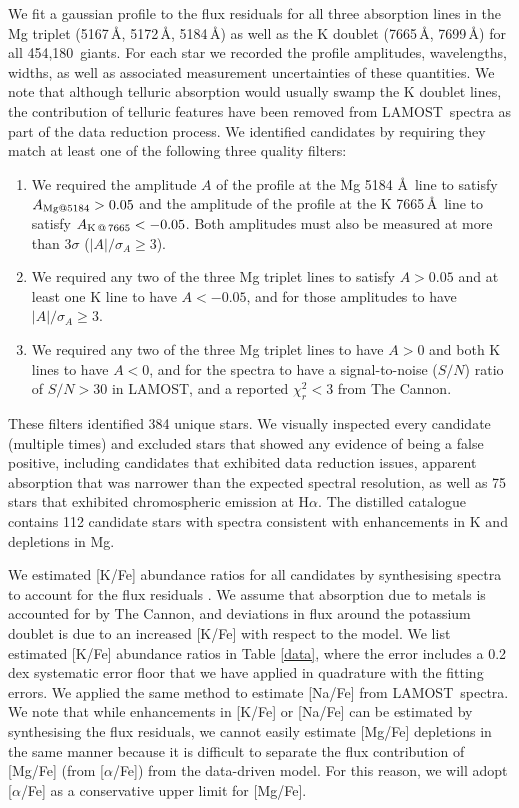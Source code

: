 \documentclass[a4paper,fleqn,usenatbib]{mnras}
\newcommand{\LamostGiants}{454,180}
\newcommand{\project}[1]{#1}
\newcommand{\lamost}{\project{LAMOST}}
\newcommand{\tc}{\project{The Cannon}}
\begin{document}
We fit a gaussian profile to the flux residuals for all three absorption lines in the Mg triplet (5167\,\AA, 5172\,\AA, 5184\,\AA) as well as the K doublet (7665\,\AA, 7699\,\AA) for all \LamostGiants\ giants. For each star we recorded the profile amplitudes, wavelengths, widths, as well as associated measurement uncertainties of these quantities. We note that although telluric absorption would usually swamp the K doublet lines, the contribution of telluric features have been removed from \lamost\ spectra as part of the data  reduction process. We identified candidates by requiring they match at least one of the following three quality filters:
\begin{enumerate}
\item We required the amplitude $A$ of the profile at the Mg 5184 \AA \ line to satisfy $A_{{\rm Mg} @ 5184} > 0.05$ and the amplitude of the profile at the K 7665\,\AA\ line to satisfy $A_{{\rm K}\,@\,7665} < -0.05$. Both amplitudes must also be measured at more than $3\sigma$ ($|A|/\sigma_{A} \geq 3$).
\item We required any two of the three Mg triplet lines to satisfy $A > 0.05$ and at least one K line to have $A < -0.05$, and for those amplitudes to have $|A|/\sigma_{A} \geq 3$.
\item We required any two of the three Mg triplet lines to have $A > 0$ and both K lines to have $A < 0$, and for the spectra to have a signal-to-noise ($S/N$) ratio of $S/N > 30$ in \lamost, and a reported $\chi_{r}^2 < 3$ from \tc.
\end{enumerate} 
 
These filters identified 384 unique stars. We visually inspected every candidate (multiple times) and excluded stars that showed any evidence of being a false positive, including candidates that exhibited data reduction issues, apparent absorption that was narrower than the expected spectral resolution, as well as 75 stars that exhibited chromospheric emission at H$\alpha$. The distilled catalogue contains 112 candidate stars with spectra consistent with enhancements in K and depletions in Mg.

We estimated [K/Fe] abundance ratios for all candidates by synthesising spectra to account for the flux residuals \citep{marcs,sme,vald,ispec}. We assume that absorption due to metals is accounted for by \tc, and deviations in flux around the potassium doublet is due to an increased [K/Fe] with respect to the model. We list estimated [K/Fe] abundance ratios in Table \ref{data}, where the error includes a 0.2\,dex systematic error floor that we have applied in quadrature with the fitting errors. We applied the same method to estimate [Na/Fe] from \lamost\ spectra. We note that while enhancements in [K/Fe] or [Na/Fe] can be estimated by synthesising the flux residuals, we cannot easily estimate [Mg/Fe] depletions in the same manner because it is difficult to separate the flux contribution of [Mg/Fe] (from [$\alpha$/Fe]) from the data-driven model. For this reason, we will adopt [$\alpha$/Fe] as a conservative upper limit for [Mg/Fe].
\end{document}
